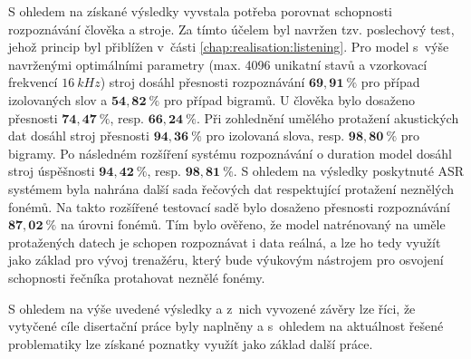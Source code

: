 S ohledem na získané výsledky vyvstala potřeba porovnat schopnosti rozpoznávání člověka a stroje. Za tímto účelem byl navržen tzv. poslechový test, jehož princip byl přiblížen v~části \ref{chap:realisation:listening}. Pro model s~výše navrženými optimálními parametry (max. 4096 unikatní stavů a vzorkovací frekvencí $16\ kHz$) stroj dosáhl přesnosti rozpoznávání $\boldsymbol{69,91~\%}$ pro případ izolovaných slov a $\boldsymbol{54,82~\%}$ pro případ bigramů. U člověka bylo dosaženo přesnosti $\boldsymbol{74,47~\%}$, resp. $\boldsymbol{66,24~\%}$. Při zohlednění umělého protažení akustických dat dosáhl stroj přesnosti $\boldsymbol{94,36~\%}$ pro izolovaná slova, resp. $\boldsymbol{98,80~\%}$ pro bigramy. Po následném rozšíření systému rozpoznávání o duration model dosáhl stroj úspěšnosti $\boldsymbol{94,42~\%}$, resp. $\boldsymbol{98,81~\%}$. S ohledem na výsledky poskytnuté ASR systémem byla nahrána další sada řečových dat respektující protažení neznělých fonémů. Na takto rozšířené testovací sadě bylo dosaženo přesnosti rozpoznávání $\boldsymbol{87,02~\%}$ na úrovni fonémů. Tím bylo ověřeno, že model natrénovaný na uměle protažených datech je schopen rozpoznávat i data reálná, a lze ho tedy využít jako základ pro vývoj trenažéru, který bude výukovým nástrojem pro osvojení schopnosti řečníka protahovat neznělé fonémy.

S ohledem na výše uvedené výsledky a z~nich vyvozené závěry lze říci, že vytyčené cíle disertační práce byly naplněny a s~ohledem na aktuálnost řešené problematiky lze získané poznatky využít jako základ další práce.

\ifdefined\CELE
\else

\fi
